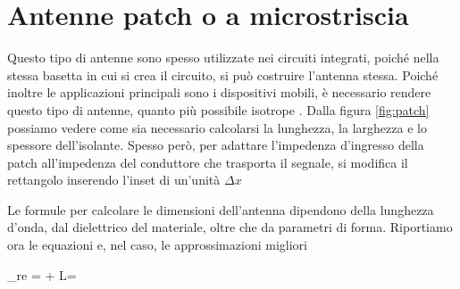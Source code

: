 \section{Antenne patch o a microstriscia}
Questo tipo di antenne sono spesso utilizzate nei circuiti integrati, poiché nella stessa basetta in cui si crea il circuito, si può costruire l'antenna stessa. Poiché inoltre le applicazioni principali sono i dispositivi mobili, è necessario rendere questo tipo di antenne, quanto più possibile isotrope .
Dalla figura \ref{fig:patch} possiamo vedere come sia necessario calcolarsi la lunghezza, la larghezza e lo spessore dell'isolante. Spesso però, per adattare l'impedenza d'ingresso della patch all'impedenza del conduttore che trasporta il segnale, si modifica il rettangolo inserendo l'inset di un'unità $\Delta x$

Le formule per calcolare le dimensioni dell'antenna dipendono della lunghezza d'onda, dal dielettrico del materiale, oltre che da parametri di forma.
Riportiamo ora le equazioni e, nel caso, le approssimazioni migliori

\begin{esp}\label{eq:paramPatch}
  \epsilon_{re} =  +
  L=
\end{esp}
